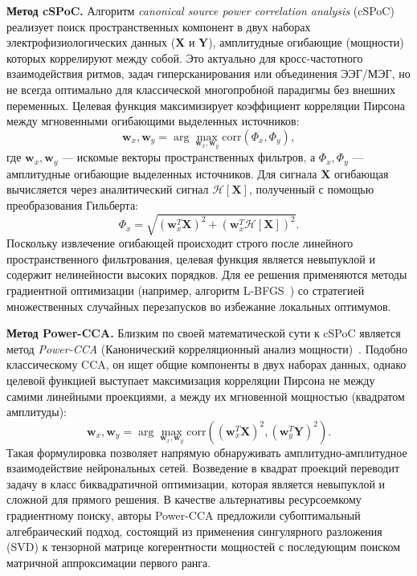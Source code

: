 \textbf{Метод cSPoC.}
Алгоритм \textit{canonical source power correlation analysis} (cSPoC)~\cite{dahne2014cspoc} реализует поиск пространственных компонент в двух наборах электрофизиологических данных ($\mathbf{X}$ и $\mathbf{Y}$), амплитудные огибающие (мощности) которых коррелируют между собой. Это актуально для кросс-частотного взаимодействия ритмов, задач гиперсканирования или объединения ЭЭГ/МЭГ, но не всегда оптимально для классической многопробной парадигмы без внешних переменных. Целевая функция максимизирует коэффициент корреляции Пирсона между мгновенными огибающими выделенных источников:
\begin{equation}
	\mathbf{w}_x, \mathbf{w}_y = \arg\max_{\mathbf{w}_x, \mathbf{w}_y} \text{corr}(\Phi_x, \Phi_y),
\end{equation}
где $\mathbf{w}_x, \mathbf{w}_y$ --- искомые векторы пространственных фильтров, а $\Phi_x, \Phi_y$ --- амплитудные огибающие выделенных источников. Для сигнала $\mathbf{X}$ огибающая вычисляется через аналитический сигнал $\mathcal{H}[\mathbf{X}]$, полученный с помощью преобразования Гильберта:
\begin{equation}
	\Phi_x = \sqrt{(\mathbf{w}_x^T \mathbf{X})^2 + (\mathbf{w}_x^T \mathcal{H}[\mathbf{X}])^2}.
\end{equation}
Поскольку извлечение огибающей происходит строго после линейного пространственного фильтрования, целевая функция является невыпуклой и содержит нелинейности высоких порядков. Для ее решения применяются методы градиентной оптимизации (например, алгоритм L-BFGS~\cite{nocedal1980updating}) со стратегией множественных случайных перезапусков во избежание локальных оптимумов.

\textbf{Метод Power-CCA.}
Близким по своей математической сути к cSPoC является метод \textit{Power-CCA} (Канонический корреляционный анализ мощности)~\cite{ramirez2013powercca}. Подобно классическому CCA, он ищет общие компоненты в двух наборах данных, однако целевой функцией выступает максимизация корреляции Пирсона не между самими линейными проекциями, а между их мгновенной мощностью (квадратом амплитуды):
\begin{equation}
	\mathbf{w}_x, \mathbf{w}_y = \arg\max_{\mathbf{w}_x, \mathbf{w}_y} \text{corr}\left((\mathbf{w}_x^T \mathbf{X})^2, (\mathbf{w}_y^T \mathbf{Y})^2\right).
\end{equation}
Такая формулировка позволяет напрямую обнаруживать амплитудно-амплитудное взаимодействие нейрональных сетей. Возведение в квадрат проекций переводит задачу в класс биквадратичной оптимизации, которая является невыпуклой и сложной для прямого решения. В качестве альтернативы ресурсоемкому градиентному поиску, авторы Power-CCA предложили субоптимальный алгебраический подход, состоящий из применения сингулярного разложения (SVD) к тензорной матрице когерентности мощностей с последующим поиском матричной аппроксимации первого ранга.

